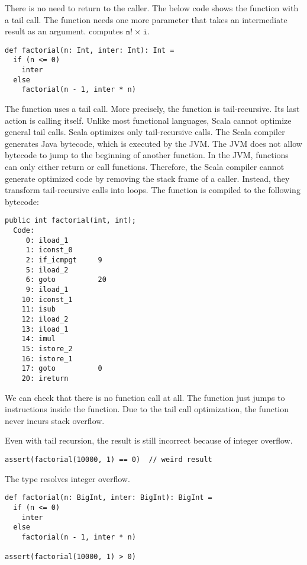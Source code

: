 There is no need to return to the caller. The below code shows the
 function with a tail call. The function needs one more parameter
that takes an intermediate result as an argument.
 computes \(\texttt{n}!\times\texttt{i}\).

\begin{verbatim}
def factorial(n: Int, inter: Int): Int =
  if (n <= 0)
    inter
  else
    factorial(n - 1, inter * n)
\end{verbatim}

The function uses a tail call. More precisely, the function is
tail-recursive. Its last action is calling itself. Unlike most functional
languages, Scala cannot optimize general tail calls. Scala optimizes only
tail-recursive calls.
The Scala compiler generates Java bytecode, which is executed by the JVM. The JVM does not
allow bytecode to jump to the beginning of another function. In the JVM, functions can
only either return or call functions. Therefore, the Scala compiler cannot generate
optimized code by removing the stack frame of a caller. Instead, they transform
tail-recursive calls into loops.
The  function is compiled to the following bytecode:

\begin{verbatim}
public int factorial(int, int);
  Code:
     0: iload_1
     1: iconst_0
     2: if_icmpgt     9
     5: iload_2
     6: goto          20
     9: iload_1
    10: iconst_1
    11: isub
    12: iload_2
    13: iload_1
    14: imul
    15: istore_2
    16: istore_1
    17: goto          0
    20: ireturn
\end{verbatim}

We can check that there is no function call at
all.
The function just jumps to instructions inside the function.
Due to the tail call optimization, the function never incurs stack overflow.

Even with tail recursion,
the result is still incorrect because of integer overflow.

\begin{verbatim}
assert(factorial(10000, 1) == 0)  // weird result
\end{verbatim}

The  type resolves integer overflow.

\begin{verbatim}
def factorial(n: BigInt, inter: BigInt): BigInt =
  if (n <= 0)
    inter
  else
    factorial(n - 1, inter * n)

assert(factorial(10000, 1) > 0)
\end{verbatim}

